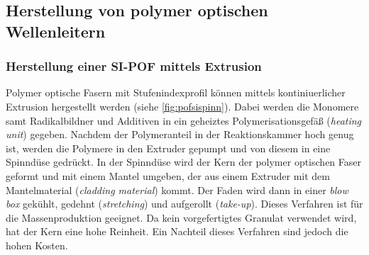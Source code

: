 \subsection{Herstellung von polymer optischen Wellenleitern}
\label{subsec:pofherstellungsverfahren}

\subsubsection{Herstellung einer SI-POF mittels Extrusion}

Polymer optische Fasern mit Stufenindexprofil können mittels kontiniuerlicher
Extrusion hergestellt werden (siehe \autoref{fig:pofsispinn}). Dabei werden die
Monomere samt Radikalbildner und Additiven in ein geheiztes Polymerisationsgefäß
(\textit{heating unit}) gegeben. Nachdem der Polymeranteil in der
Reaktionskammer hoch genug ist, werden die Polymere in den Extruder gepumpt und
von diesem in eine Spinndüse gedrückt. In der Spinndüse wird der Kern der
polymer optischen Faser geformt und mit einem Mantel umgeben, der aus einem
Extruder mit dem Mantelmaterial (\textit{cladding material}) kommt. Der Faden
wird dann in einer \textit{blow box} gekühlt, gedehnt (\textit{stretching}) und
aufgerollt (\textit{take-up}). Dieses Verfahren ist für die Massenproduktion
geeignet. Da kein vorgefertigtes Granulat verwendet wird, hat der Kern eine hohe
Reinheit. Ein Nachteil dieses Verfahren sind jedoch die hohen Kosten.

